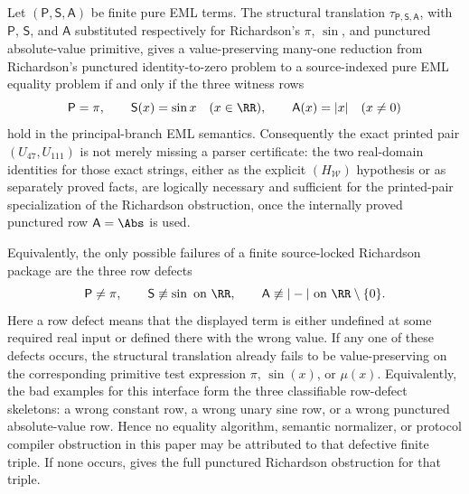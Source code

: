 \begin{theorem}
\label{thm:richardson-witness-row-rigidity}
\label{thm:richardson-row-necessity-and-sufficiency}
Let \((\mathsf P,\mathsf S,\mathsf A)\) be finite pure EML terms.  The structural
translation \(\tau_{\mathsf P,\mathsf S,\mathsf A}\), with \(\mathsf P\),
\(\mathsf S\), and \(\mathsf A\) substituted respectively for Richardson's
\(\pi\), \(\sin\), and punctured absolute-value primitive, gives a
value-preserving many-one reduction from Richardson's punctured
identity-to-zero problem to a source-indexed pure EML equality problem if and
only if the three witness rows
\[
  \mathsf P=\pi,
  \qquad \mathsf S(x)=\sin x\quad(x\in\RR),
  \qquad \mathsf A(x)=|x|\quad(x\ne0)
\]
hold in the principal-branch EML semantics.  Consequently the exact printed
pair \((U_{47},U_{111})\) is not merely missing a parser certificate: the two
real-domain identities for those exact strings, either as the explicit
\((H_{\mathcal W})\) hypothesis or as separately proved facts, are logically
necessary and sufficient for the printed-pair specialization of the Richardson
obstruction, once the internally proved punctured row \(\mathsf A=\Abs\) is used.

Equivalently, the only possible failures of a finite source-locked Richardson
package are the three row defects
\[
  \mathsf P\ne\pi,
  \qquad \mathsf S\not\equiv\sin\hbox{ on }\RR,
  \qquad \mathsf A\not\equiv |-|\hbox{ on }\RR\setminus\{0\}.
\]
Here a row defect means that the displayed term is either undefined at some
required real input or defined there with the wrong value.  If any one of these
defects occurs, the structural translation already fails to be value-preserving
on the corresponding primitive test expression
  \(\pi\), \(\sin(x)\), or \(\mu(x)\).  Equivalently, the bad examples for this
  interface form the three classifiable row-defect skeletons: a wrong constant
  row, a wrong unary sine row, or a wrong punctured absolute-value row.  Hence no
  equality algorithm, semantic
normalizer, or protocol compiler obstruction in this paper may be attributed to
that defective finite triple.  If none occurs,  gives the
full punctured Richardson obstruction for that triple.
\end{theorem}

